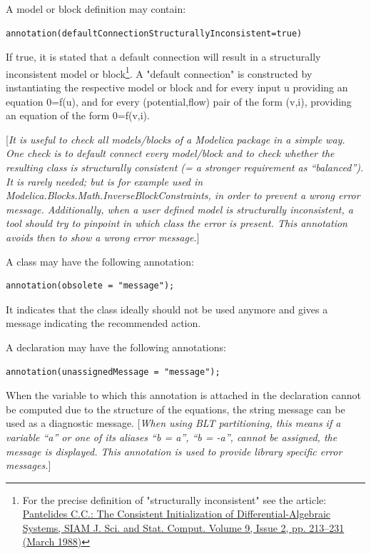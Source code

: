 \documentclass[10pt,a4paper]{report}
\begin{document}
A model or block definition may contain:
\begin{lstlisting}[language=modelica]
  annotation(defaultConnectionStructurallyInconsistent=true)
\end{lstlisting}

If true, it is stated that a default connection will result in a
structurally inconsistent model or block\footnote{For the precise
  definition of "structurally inconsistent" see the article:
  \href{http://epubs.siam.org/doi/abs/10.1137/0909014}{Pantelides C.C.:
  The Consistent Initialization of Differential-Algebraic Systems, SIAM
  J. Sci. and Stat. Comput. Volume 9, Issue 2, pp. 213--231 (March
  1988)}}. A "default connection" is constructed by instantiating the
respective model or block and for every input u providing an equation
0=f(u), and for every (potential,flow) pair of the form (v,i), providing
an equation of the form 0=f(v,i).

{[}\emph{It is useful to check all models/blocks of a Modelica package
in a simple way. One check is to default connect every model/block and
to check whether the resulting class is structurally consistent (= a
stronger requirement as ``balanced''). It is rarely needed; but is for
example used in Modelica.Blocks.Math.InverseBlockConstraints, in order
to prevent a wrong error message. Additionally, when a user defined
model is structurally inconsistent, a tool should try to pinpoint in
which class the error is present. This annotation avoids then to show a
wrong error message.}{]}

A class may have the following annotation:
\begin{lstlisting}[language=modelica]
  annotation(obsolete = "message");
\end{lstlisting}


It indicates that the class ideally should not be used anymore and gives
a message indicating the recommended action.

A declaration may have the following annotations:
\begin{lstlisting}[language=modelica]
  annotation(unassignedMessage = "message"); 
\end{lstlisting}

When the variable to which this annotation is attached in the
declaration cannot be computed due to the structure of the equations,
the string message can be used as a diagnostic message. {[}\emph{When
using BLT partitioning, this means if a variable ``a'' or one of its
aliases ``b = a'', ``b = -a'', cannot be assigned, the message is
displayed. This annotation is used to provide library specific error
messages.}{]}
\end{document}
